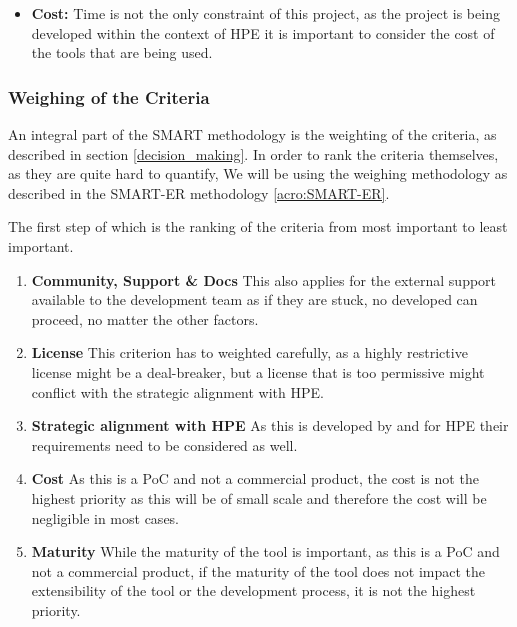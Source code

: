 \begin{itemize}
    \item \textbf{Cost:}
        Time is not the only constraint of this project, as the project is being developed within the context of \ac{HPE} it is important to consider the cost of the tools that are being used.

\end{itemize}

\subsubsection{Weighing of the Criteria}

An integral part of the \ac{SMART} methodology is the weighting of the criteria, as described in section \ref{decision_making}.
In order to rank the criteria themselves, as they are quite hard to quantify, 
We will be using the weighing methodology as described in the \ac{SMART-ER} methodology \ref{acro:SMART-ER}.

The first step of which is the ranking of the criteria from most important to least important.

\begin{enumerate}
    \item \textbf{ Community, Support \& Docs } This also applies for the external support available to the development team as if they are stuck, no developed can proceed, no matter the other factors.
    \item \textbf{ License } This criterion has to weighted carefully, as a highly restrictive license might be a deal-breaker, but a license that is too permissive might conflict with the strategic alignment with \ac{HPE}.
    \item \textbf{ Strategic alignment with \ac{HPE} } As this is developed by and for \ac{HPE} their requirements need to be considered as well.
    \item \textbf{ Cost } As this is a \ac{PoC} and not a commercial product, the cost is not the highest priority as this will be of small scale and therefore the cost will be negligible in most cases.
    \item \textbf{ Maturity } While the maturity of the tool is important, as this is a \ac{PoC} and not a commercial product, if the maturity of the tool does not impact the extensibility of the tool or the development process, it is not the highest priority.
\end{enumerate}


